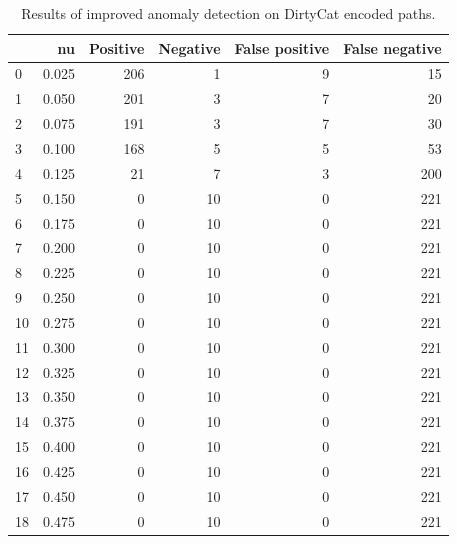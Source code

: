 \documentclass[a4paper,twoside,12pt]{book}
\begin{document}
\begin{appendices}
\begin{table}
	\centering
	\caption{Results of improved anomaly detection on DirtyCat encoded paths.}
	\label{id:tab:ocsvmOnDirtyCatGood}
	\begin{tabular}{lrrrrr}
		\toprule
		{} &     nu &  Positive &  Negative &  False positive &  False negative \\
		\midrule
		0  &  0.025 &       206 &         1 &               9 &              15 \\
		1  &  0.050 &       201 &         3 &               7 &              20 \\
		2  &  0.075 &       191 &         3 &               7 &              30 \\
		3  &  0.100 &       168 &         5 &               5 &              53 \\
		4  &  0.125 &        21 &         7 &               3 &             200 \\
		5  &  0.150 &         0 &        10 &               0 &             221 \\
		6  &  0.175 &         0 &        10 &               0 &             221 \\
		7  &  0.200 &         0 &        10 &               0 &             221 \\
		8  &  0.225 &         0 &        10 &               0 &             221 \\
		9  &  0.250 &         0 &        10 &               0 &             221 \\
		10 &  0.275 &         0 &        10 &               0 &             221 \\
		11 &  0.300 &         0 &        10 &               0 &             221 \\
		12 &  0.325 &         0 &        10 &               0 &             221 \\
		13 &  0.350 &         0 &        10 &               0 &             221 \\
		14 &  0.375 &         0 &        10 &               0 &             221 \\
		15 &  0.400 &         0 &        10 &               0 &             221 \\
		16 &  0.425 &         0 &        10 &               0 &             221 \\
		17 &  0.450 &         0 &        10 &               0 &             221 \\
		18 &  0.475 &         0 &        10 &               0 &             221 \\

\end{tabular}
\end{table}
\end{appendices}
\end{document}

